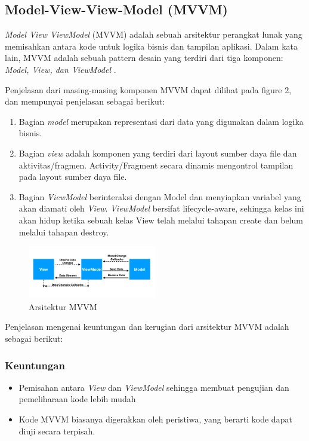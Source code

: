 \documentclass[conference]{IEEEtran}
\begin{document}
	\subsection{Model-View-View-Model (MVVM)}
	\textit{Model View ViewModel} (MVVM) adalah sebuah arsitektur perangkat lunak yang memisahkan antara kode untuk logika bisnis dan tampilan aplikasi\cite{MVVM}. Dalam kata lain, MVVM adalah sebuah pattern desain yang terdiri dari tiga komponen: \textit{Model, View, dan ViewModel} \cite{MVVM2}.  
	
	Penjelasan dari masing-masing komponen MVVM dapat dilihat pada figure 2, dan mempunyai penjelasan sebagai berikut:
	\begin{enumerate}[label=\alph*]
		\item Bagian \textit{model} merupakan representasi dari data yang digunakan dalam logika bisnis.
		\item Bagian \textit{view} adalah komponen yang terdiri dari layout sumber daya file dan aktivitas/fragmen. Activity/Fragment secara dinamis mengontrol tampilan pada layout sumber daya file.
		\item Bagian \textit{ViewModel} berinteraksi dengan Model dan menyiapkan variabel yang akan diamati oleh \textit{View}. \textit{ViewModel} bersifat lifecycle-aware, sehingga kelas ini akan hidup ketika sebuah kelas View telah melalui tahapan create dan belum melalui tahapan destroy.
	\end{enumerate}
	
	\begin{figure}[h]
		\centering
		\includegraphics[width=0.5\textwidth]{images/MVVM}
		\caption{Arsitektur MVVM}
		\label{fig:class_mvvm}
	\end{figure}
	
	Penjelasan mengenai keuntungan dan kerugian dari arsitektur MVVM adalah sebagai berikut:
	\subsubsection{Keuntungan}
	\begin{itemize}
		\item Pemisahan antara \textit{View} dan \textit{ViewModel} sehingga membuat pengujian dan pemeliharaan kode lebih mudah
		\item Kode MVVM biasanya digerakkan oleh peristiwa, yang berarti kode dapat diuji secara terpisah.
	\end{itemize}
\end{document}
